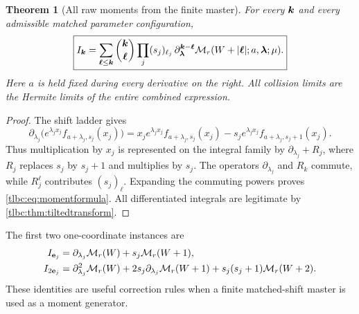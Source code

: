 \documentclass[11pt,letterpaper]{article}
\numberwithin{equation}{section}
\newtheorem{theorem}{Theorem}[section]
\theoremstyle{definition}\newtheorem{definition}[theorem]{Definition}
\theoremstyle{remark}\newtheorem{remark}[theorem]{Remark}
\newcommand{\M}{\mathcal M}\newcommand{\T}{\mathcal T}\newcommand{\K}{\mathcal K}
\begin{document}
\begin{theorem}[All raw moments from the finite master]\label{tlbc:thm:moments}
For every $\boldsymbol k$ and every admissible matched parameter configuration,
\begin{equation}\label{tlbc:eq:momentformula}
 \boxed{\displaystyle
 I_{\bk}
 =\sum_{\boldsymbol\ell\le\bk}
     \binom{\bk}{\boldsymbol\ell}
     \prod_j(s_j)_{\ell_j}\,
     \partial_{\bl}^{\bk-\boldsymbol\ell}
     \M_r(W+|\boldsymbol\ell|;a,\bl;\mu).}
\end{equation}
Here $a$ is held fixed during every derivative on the right. All collision limits are the Hermite limits of the entire combined expression.
\end{theorem}
\begin{proof}
The shift ladder gives
\[
 \partial_{\lambda_j}\bigl(e^{\lambda_jx_j}f_{a+\lambda_j,s_j}(x_j)\bigr)
 =x_je^{\lambda_jx_j}f_{a+\lambda_j,s_j}(x_j)
       -s_je^{\lambda_jx_j}f_{a+\lambda_j,s_j+1}(x_j).
\]
Thus multiplication by $x_j$ is represented on the integral family by
$\partial_{\lambda_j}+R_j$, where $R_j$ replaces $s_j$ by $s_j+1$ and multiplies by $s_j$. The operators $\partial_{\lambda_j}$ and $R_k$ commute, while $R_j^{\ell}$ contributes $(s_j)_\ell$. Expanding the commuting powers proves \eqref{tlbc:eq:momentformula}. All differentiated integrals are legitimate by \cref{tlbc:thm:tiltedtransform}.
\end{proof}
The first two one-coordinate instances are
\begin{align}
 I_{\mathbf e_j}&=\partial_{\lambda_j}\M_r(W)+s_j\M_r(W+1),\notag\\
 I_{2\mathbf e_j}&=\partial_{\lambda_j}^2\M_r(W)
       +2s_j\partial_{\lambda_j}\M_r(W+1)
       +s_j(s_j+1)\M_r(W+2).
 \label{tlbc:eq:lowmoments}
\end{align}
These identities are useful correction rules when a finite matched-shift master is used as a moment generator.
\end{document}
